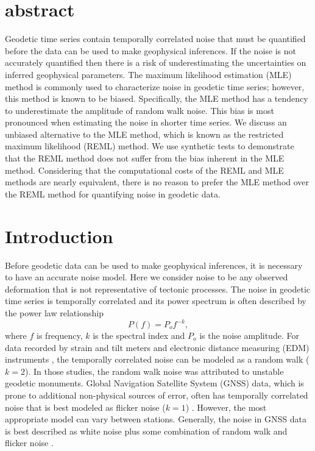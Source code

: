 \section{abstract}
Geodetic time series contain temporally correlated noise that must be quantified before the data can be used to make geophysical inferences. If the noise is not accurately quantified then there is a risk of underestimating the uncertainties on inferred geophysical parameters. The maximum likelihood estimation (MLE) method is commonly used to characterize noise in geodetic time series; however, this method is known to be biased. Specifically, the MLE method has a tendency to underestimate the amplitude of random walk noise. This bias is most pronounced when estimating the noise in shorter time series. We discuss an unbiased alternative to the MLE method, which is known as the restricted maximum likelihood (REML) method. We use synthetic tests to demonstrate that the REML method does not suffer from the bias inherent in the MLE method. Considering that the computational costs of the REML and MLE methods are nearly equivalent, there is no reason to prefer the MLE method over the REML method for quantifying noise in geodetic data. 

\section{Introduction}\label{sec:Introduction}
Before geodetic data can be used to make geophysical inferences, it is necessary to have an accurate noise model. Here we consider noise to be any observed deformation that is not representative of tectonic processes. The noise in geodetic time series is temporally correlated and its power spectrum is often described by the power law relationship \citep{Agnew1992}       
\begin{equation}\label{eq.PowerLaw}
  P(f) = P_o f^{-k},
\end{equation}
where $f$ is frequency, $k$ is the spectral index and $P_o$ is the noise amplitude. For data recorded by strain and tilt meters \citep{Wyatt1982,Wyatt1989} and electronic distance measuring (EDM) instruments \citep{Langbein1997}, the temporally correlated noise can be modeled as a random walk ($k = 2$). In those studies, the random walk noise was attributed to unstable geodetic monuments. Global Navigation Satellite System (GNSS) data, which is prone to additional non-physical sources of error, often has temporally correlated noise that is best modeled as flicker noise ($k = 1$) \citep[e.g.,][]{Zhang1997,Mao1999,Williams2004}. However, the most appropriate model can vary between stations. Generally, the noise in GNSS data is best described as white noise plus some combination of random walk and flicker noise \citep{Langbein2008}. 

